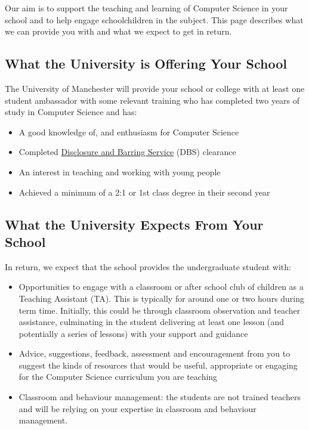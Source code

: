 \documentclass[
  12pt,
]{book}
\providecommand{\tightlist}{%
  \setlength{\itemsep}{0pt}\setlength{\parskip}{0pt}}
\begin{document}
Our aim is to support the teaching and learning of Computer Science in your school and to help engage schoolchildren in the subject. This page describes what we can provide you with and what we expect to get in return.

\hypertarget{what-the-university-is-offering-your-school}{%
\subsection{What the University is Offering Your School}\label{what-the-university-is-offering-your-school}}

The University of Manchester will provide your school or college with at least one student ambassador with some relevant training who has completed two years of study in Computer Science and has:

\begin{itemize}
\tightlist
\item
  A good knowledge of, and enthusiasm for Computer Science
\item
  Completed \href{https://www.gov.uk/government/organisations/disclosure-and-barring-service}{Disclosure and Barring Service} (DBS) clearance
\item
  An interest in teaching and working with young people
\item
  Achieved a minimum of a 2:1 or 1st class degree in their second year
\end{itemize}

\hypertarget{expectations}{%
\subsection{What the University Expects From Your School}\label{expectations}}

In return, we expect that the school provides the undergraduate student with:

\begin{itemize}
\tightlist
\item
  Opportunities to engage with a classroom or after school club of children as a Teaching Assistant (TA). This is typically for around one or two hours during term time. Initially, this could be through classroom observation and teacher assistance, culminating in the student delivering at least one lesson (and potentially a series of lessons) with your support and guidance
\item
  Advice, suggestions, feedback, assessment and encouragement from you to suggest the kinds of resources that would be useful, appropriate or engaging for the Computer Science curriculum you are teaching
\item
  Classroom and behaviour management: the students are not trained teachers and will be relying on your expertise in classroom and behaviour management.
\end{itemize}
\end{document}
